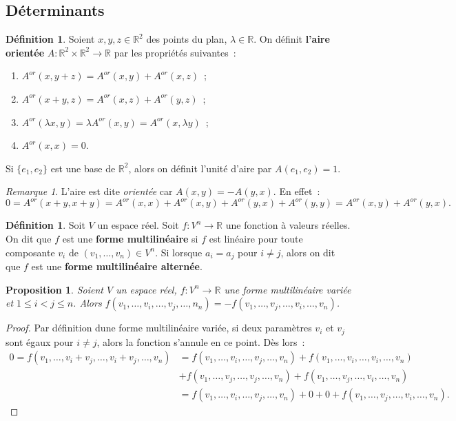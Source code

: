 \documentclass{article}
\newcommand{\R}{\mathbb R}
\newcommand{\Aor}{A^{or}}
\newtheorem{prp}[thm]{Proposition}
\theoremstyle{definition}
\newtheorem{déf}[thm]{Définition}
\theoremstyle{remark}
\newtheorem*{rmq}{Remarque}
\begin{document}
	\subsection{Déterminants}
		\begin{déf} Soient $x, y, z \in \R^2$ des points du plan, $\lambda \in \R$. On définit \textbf{l'aire orientée} $A : \R^2 \times \R^2 \to \R$ par les propriétés
		suivantes~:

		\begin{enumerate}
			\item $\Aor(x, y+z) = \Aor(x, y) + \Aor(x, z)$~;
			\item $\Aor(x+y, z) = \Aor(x, z) + \Aor(y, z)$~;
			\item $\Aor(\lambda x, y) = \lambda\Aor(x, y) = \Aor(x, \lambda y)$~;
			\item $\Aor(x, x) = 0$.
		\end{enumerate}

		Si $\{e_1, e_2\}$ est une base de $\R^2$, alors on définit l'unité d'aire par $A(e_1, e_2) = 1$. \end{déf}

		\begin{rmq} L'aire est dite \textit{orientée} car $A(x, y) = -A(y, x)$. En effet~:
		\[0 = \Aor(x+y, x+y) = \Aor(x, x) + \Aor(x, y) + \Aor(y, x) + \Aor(y, y) = \Aor(x, y) + \Aor(y, x).\] \end{rmq}

		\begin{déf} Soit $V$ un espace réel. Soit $f : V^n \to \R$ une fonction à valeurs réelles. On dit que $f$ est une
		\textbf{forme multilinéaire} si $f$ est linéaire pour toute composante $v_i$ de $(v_1, \dotsc, v_n) \in V^n$. Si lorsque $a_i = a_j$ pour $i \neq j$,
		alors on dit que $f$ est une \textbf{forme multilinéaire alternée}. \end{déf}

		\begin{prp}\label{ChangementDeSigneSwapDeParams} Soient $V$ un espace réel, $f : V^n \to \R$ une forme multilinéaire variée et $1 \leq i < j \leq n$. Alors
		$f(v_1, \dotsc, v_i, \dotsc, v_j, \dotsc, n_n) = -f(v_1, \dotsc, v_j, \dotsc, v_i, \dotsc, v_n)$. \end{prp}

		\begin{proof} Par définition dune forme multilinéaire variée, si deux paramètres $v_i$ et $v_j$ sont égaux pour $i \neq j$, alors
		la fonction s'annule en ce point. Dès lors~:
		\[\begin{aligned}
			0 = f(v_1, \dotsc, v_i+v_j, \dotsc, v_i+v_j, \dotsc, v_n) &= f(v_1, \dotsc, v_i, \dotsc, v_j, \dotsc, v_n) + f(v_1, \dotsc, v_i, \dotsc, v_i, \dotsc, v_n) \\
			                                                          &+ f(v_1, \dotsc, v_j, \dotsc, v_j, \dotsc, v_n) + f(v_1, \dotsc, v_j, \dotsc, v_i, \dotsc, v_n) \\
																	  &= f(v_1, \dotsc, v_i, \dotsc, v_j, \dotsc, v_n) + 0 + 0 + f(v_1, \dotsc, v_j, \dotsc, v_i, \dotsc, v_n).
		\end{aligned}\] \end{proof}
\end{document}
